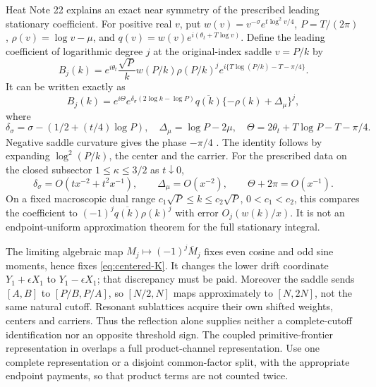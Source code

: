 \documentclass[11pt]{article}
\numberwithin{equation}{section}
\theoremstyle{definition}
\theoremstyle{remark}
\begin{document}
Heat Note 22 \cite{reflection} explains an exact near symmetry of
the prescribed leading stationary coefficient. For positive real $v$,
put $w(v)=v^{-\sigma}e^{t\log^2v/4}$, $P=T/(2\pi)$,
$\rho(v)=\log v-\mu$, and $q(v)=w(v)e^{i(\theta_t+T\log v)}$.
Define the leading coefficient of logarithmic degree $j$ at the
original-index saddle $v=P/k$ by
\begin{equation}
 B_j(k)=e^{i\theta_t}\frac{\sqrt P}{k}w(P/k)\rho(P/k)^j
          e^{i\{T\log(P/k)-T-\pi/4\}}.
\end{equation}
It can be written exactly as
\begin{equation}
 B_j(k)=e^{i\Theta}e^{\delta_\sigma(2\log k-\log P)}
          \overline{q(k)}\{-\rho(k)+\Delta_\mu\}^j,
 \label{eq:reflection}
\end{equation}
where
\[
 \delta_\sigma=\sigma-(1/2+(t/4)\log P),\quad
 \Delta_\mu=\log P-2\mu,\quad
 \Theta=2\theta_t+T\log P-T-\pi/4.
\]
Negative saddle curvature gives the phase $-\pi/4$
\cite{stationary}. The identity follows by expanding
$\log^2(P/k)$, the center and the carrier. For the prescribed data
on the closed subsector $1\le\kappa\le3/2$ as $t\downarrow0$,
\[
 \delta_\sigma=O(tx^{-2}+t^2x^{-1}),\qquad
 \Delta_\mu=O(x^{-2}),\qquad \Theta+2\pi=O(x^{-1}).
\]
On a fixed macroscopic dual range
$c_1\sqrt P\le k\le c_2\sqrt P$, $0<c_1<c_2$, this compares the coefficient to
$(-1)^j\overline{q(k)}\rho(k)^j$ with error $O_j(w(k)/x)$.
It is not an endpoint-uniform approximation theorem for the full
stationary integral.

The limiting algebraic map $M_j\mapsto(-1)^j\overline M_j$
fixes even cosine and odd sine moments, hence fixes
\eqref{eq:centered-K}. It changes the lower drift coordinate
$Y_1+\epsilon X_1$ to $Y_1-\epsilon X_1$; that discrepancy must
be paid. Moreover the saddle sends $[A,B]$ to $[P/B,P/A]$,
so $[N/2,N]$ maps approximately to $[N,2N]$, not the same
natural cutoff. Resonant sublattices acquire their own shifted
weights, centers and carriers. Thus the reflection alone supplies
neither a complete-cutoff identification nor an opposite threshold
sign. The coupled primitive-frontier representation in \cite{torus}
overlaps a full product-channel representation. Use one complete
representation or a disjoint common-factor split, with the appropriate
endpoint payments, so that product terms are not counted twice.
\end{document}
